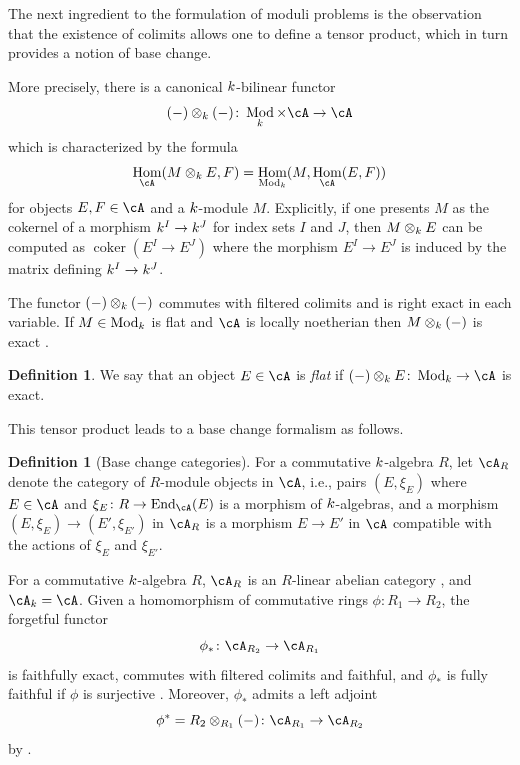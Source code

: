 \documentclass[a4paper]{amsart}
\numberwithin{equation}{section}
\theoremstyle{plain}
\theoremstyle{definition}
\newtheorem{defn}[thm]{Definition}
\DeclareMathOperator{\Hom}{Hom}
\DeclareMathOperator{\Mod}{Mod}
\DeclareMathOperator{\coker}{coker}
\newcommand{\co}{\colon}
\newcommand{\tensor}{\otimes}
\DeclareMathOperator{\End}{End}
\begin{document}
The next ingredient to the formulation of moduli problems is the observation that the existence of colimits allows one to define a tensor product, which in turn provides a notion of base change. 


More precisely, there is a canonical ${k}$-bilinear functor 
\begin{equation} \label{E:tensor}
(-) \tensor_{\base} (-) \co \Mod_{\base} \times \cA \to \cA
\end{equation}
which is characterized by the formula $$\Hom_{\cA}(M \tensor_{\base} E,F) = \Hom_{\Mod_{\base}}(M,\Hom_{\cA}(E,F))$$
for objects $E,F \in \cA$ and a $k$-module $M$.  Explicitly, if one presents $M$ as the cokernel of a morphism $k^I \to k^J$ for index sets $I$ and $J$, then $M \tensor_{\base} E$ can be computed as $\coker(E^I \to E^J)$ where the morphism $E^I \to E^J$ is induced by the matrix defining $k^I \to k^J$.

The functor $(-)\tensor_{\base} (-)$ commutes with filtered colimits and is right exact in each variable. If $M \in \Mod_{\base}$ is flat and $\cA$ is locally noetherian then $M \tensor_{\base}(-)$ is exact \cite[Lem.~C1.1]{artin-zhang}.

\begin{defn} \label{D:flatness} \cite[\S C1]{artin-zhang}
	We say that an object $E \in \cA$ is \emph{flat} if $(-) \tensor_{\base} E \co \Mod_{\base} \to \cA$ is exact.
\end{defn}

This tensor product leads to a base change formalism as follows.

\begin{defn}[Base change categories] \cite[\S B2]{artin-zhang}
For a commutative ${k}$-algebra $R$, let $\cA_R$ denote the category of $R$-module objects in $\cA$, i.e., pairs $(E, \xi_E)$ where $E \in \cA$ and $\xi_E \co R \to \End_{\cA}(E)$ is a morphism of $k$-algebras, and a morphism $(E, \xi_E) \to (E', \xi_{E'})$ in $\cA_R$ is a morphism $E \to E'$ in $\cA$ compatible with the actions of $\xi_E$ and $\xi_{E'}$.
\end{defn}

For a commutative ${k}$-algebra $R$, $\cA_R$ is an $R$-linear abelian category \cite[Prop.~B2.2]{artin-zhang}, and $\cA_{\base} = \cA$. Given a homomorphism of commutative rings $\phi \co R_1 \to R_2$, the forgetful functor 
$$\phi_\ast \co \cA_{R_2} \to \cA_{R_1}$$ 
is faithfully exact, commutes with filtered colimits and faithful, and $\phi_\ast$ is fully faithful if $\phi$ is surjective \cite[Prop.~B2.3]{artin-zhang}. Moreover, $\phi_\ast$ admits a left adjoint 
$$\phi^*=R_2 \otimes_{R_1} (-) \co \cA_{R_1} \to \cA_{R_2}$$
by \cite[Prop.~B3.16]{artin-zhang}.
\end{document}
